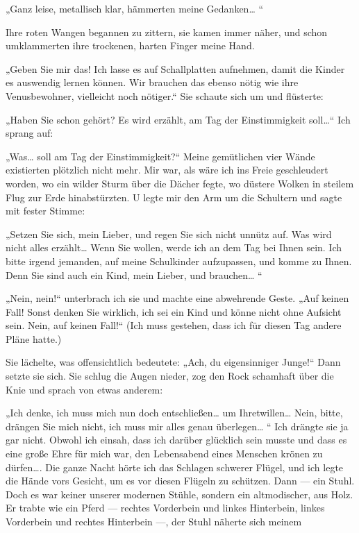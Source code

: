 „Ganz leise, metallisch klar, hämmerten meine Gedanken\ldots{} “

Ihre roten Wangen begannen zu zittern, sie kamen immer näher, und
schon umklammerten ihre trockenen, harten Finger meine Hand.

„Geben Sie mir das! Ich lasse es auf Schallplatten aufnehmen, damit
die Kinder es auswendig lernen können. Wir brauchen das ebenso
nötig wie ihre Venusbewohner, vielleicht noch nötiger.“ Sie schaute
sich um und flüsterte:

„Haben Sie schon gehört? Es wird erzählt, am Tag der Einstimmigkeit
soll\ldots{}“ Ich sprang auf:

„Was\ldots{} soll am Tag der Einstimmigkeit?“ Meine gemütlichen vier
Wände existierten plötzlich nicht mehr. Mir war, als wäre ich ins
Freie geschleudert worden, wo ein wilder Sturm über die Dächer
fegte, wo düstere Wolken in steilem Flug zur Erde hinabstürzten. U
legte mir den Arm um die Schultern und sagte mit fester Stimme:

„Setzen Sie sich, mein Lieber, und regen Sie sich nicht unnütz auf.
Was wird nicht alles erzählt\ldots{} Wenn Sie wollen, werde ich an dem
Tag bei Ihnen sein. Ich bitte irgend jemanden, auf meine
Schulkinder aufzupassen, und komme zu Ihnen. Denn Sie sind auch ein
Kind, mein Lieber, und brauchen\ldots{} “

„Nein, nein!“ unterbrach ich sie und machte eine abwehrende Geste.
„Auf keinen Fall! Sonst denken Sie wirklich, ich sei ein Kind und
könne nicht ohne Aufsicht sein. Nein, auf keinen Fall!“ (Ich muss
gestehen, dass ich für diesen Tag andere Pläne hatte.)

Sie lächelte, was offensichtlich bedeutete: „Ach, du eigensinniger
Junge!“ Dann setzte sie sich. Sie schlug die Augen nieder, zog den
Rock schamhaft über die Knie und sprach von etwas anderem:

„Ich denke, ich muss mich nun doch entschließen\ldots{} um
Ihretwillen\ldots{} Nein, bitte, drängen Sie mich nicht, ich muss mir
alles genau überlegen\ldots{} “ Ich drängte sie ja gar nicht. Obwohl ich
einsah, dass ich darüber glücklich sein musste und dass es eine
große Ehre für mich war, den Lebensabend eines Menschen krönen zu
dürfen\ldots{}. Die ganze Nacht hörte ich das Schlagen schwerer Flügel,
und ich legte die Hände vors Gesicht, um es vor diesen Flügeln zu
schützen. Dann — ein Stuhl. Doch es war keiner unserer modernen
Stühle, sondern ein altmodischer, aus Holz. Er trabte wie ein Pferd
— rechtes Vorderbein und linkes Hinterbein, linkes Vorderbein und
rechtes Hinterbein —, der Stuhl näherte sich meinem

